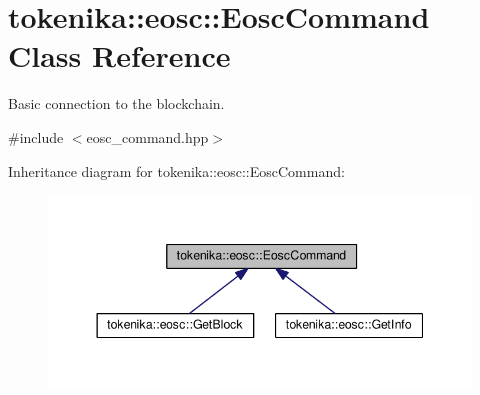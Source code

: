 \hypertarget{classtokenika_1_1eosc_1_1_eosc_command}{}\section{tokenika\+:\+:eosc\+:\+:Eosc\+Command Class Reference}
\label{classtokenika_1_1eosc_1_1_eosc_command}


Basic connection to the blockchain.  




{\ttfamily \#include $<$eosc\+\_\+command.\+hpp$>$}



Inheritance diagram for tokenika\+:\+:eosc\+:\+:Eosc\+Command\+:
\nopagebreak
\begin{figure}[H]
\begin{center}
\leavevmode
\includegraphics[width=344pt]{classtokenika_1_1eosc_1_1_eosc_command__inherit__graph}
\end{center}
\end{figure}

